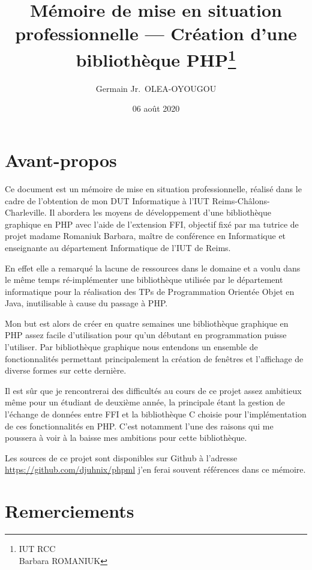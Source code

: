 \documentclass[11pt,a4paper,krantz2,11pt,oneside]{krantz}
\title{Mémoire de mise en situation professionnelle --- Création d'une bibliothèque PHP\thanks{IUT RCC\\
Barbara ROMANIUK}}
\author{Germain Jr.~OLEA-OYOUGOU}
\date{06 août 2020}
\begin{document}
\maketitle

{
\hypersetup{linkcolor=}
\setcounter{tocdepth}{1}
\tableofcontents
}
\listoftables
\listoffigures
\hypertarget{avant-propos}{%
\chapter*{Avant-propos}\label{avant-propos}}


Ce document est un mémoire de mise en situation professionnelle, réalisé dans le cadre de l'obtention de mon DUT Informatique à l'IUT Reims-Châlons-Charleville. Il abordera les moyens de développement d'une bibliothèque graphique en PHP avec l'aide de l'extension FFI, objectif fixé par ma tutrice de projet madame Romaniuk Barbara, maître de conférence en Informatique et enseignante au département Informatique de l'IUT de Reims.

En effet elle a remarqué la lacune de ressources dans le domaine et a voulu dans le même temps ré-implémenter une bibliothèque utilisée par le département informatique pour la réalisation des TPs de Programmation Orientée Objet en Java, inutilisable à cause du passage à PHP.

Mon but est alors de créer en quatre semaines une bibliothèque graphique en PHP assez facile d'utilisation pour qu'un débutant en programmation puisse l'utiliser. Par bibliothèque graphique nous entendons un ensemble de fonctionnalités permettant principalement la création de fenêtres et l'affichage de diverse formes sur cette dernière.

Il est sûr que je rencontrerai des difficultés au cours de ce projet assez ambitieux même pour un étudiant de deuxième année, la principale étant la gestion de l'échange de données entre FFI et la bibliothèque C choisie pour l'implémentation de ces fonctionnalités en PHP. C'est notamment l'une des raisons qui me poussera à voir à la baisse mes ambitions pour cette bibliothèque.

Les sources de ce projet sont disponibles sur Github à l'adresse \url{https://github.com/djuhnix/phpml} j'en ferai souvent références dans ce mémoire.

\mainmatter

\hypertarget{remerciements}{%
\chapter*{Remerciements}\label{remerciements}}
\end{document}
